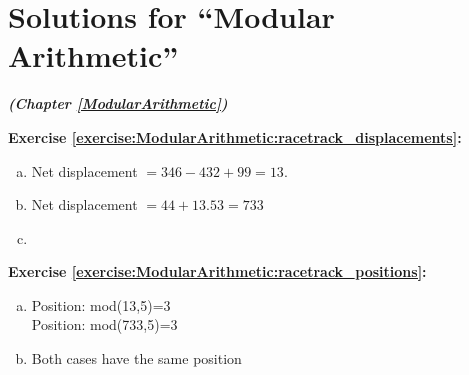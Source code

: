 \section{Solutions for ``Modular Arithmetic''}
\noindent \textbf{\textit{ (Chapter \ref{ModularArithmetic})}}\bigskip




\noindent\textbf{Exercise \ref{exercise:ModularArithmetic:racetrack_displacements}:}
\begin{enumerate}[(a)]
\item
Net displacement $=346-432+99=13$.

\item 
Net displacement $=44+13.53=733$

\item 

\end{enumerate}

\noindent\textbf{Exercise \ref{exercise:ModularArithmetic:racetrack_positions}:}
\begin{enumerate}[(a)]
\item
Position: mod(13,5)=3\\
Position: mod(733,5)=3

\item
Both cases have the same position
\end{enumerate}

